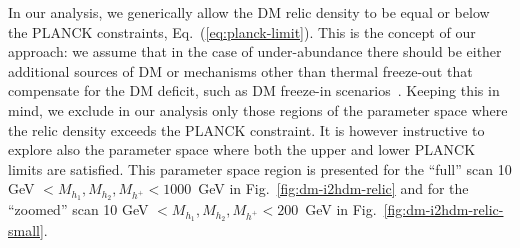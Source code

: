 In our analysis, we generically allow the DM relic density to be equal or
below the PLANCK constraints, Eq.~(\ref{eq:planck-limit}).
This is the concept of our approach: we assume that in the case of under-abundance
there should be either additional sources of DM or mechanisms other than thermal freeze-out that 
compensate for the DM deficit, such as DM freeze-in scenarios~\cite{Hall:2009bx}.
Keeping this in mind, we exclude in our analysis only those regions of the parameter space 
where the relic density exceeds the PLANCK constraint.
It is however instructive to explore also the parameter space where both
the upper and lower PLANCK limits are satisfied.
This parameter space region is presented for the ``full'' scan 10 GeV $< M_{h_1}, M_{h_2}, M_{h^{+}} < 1000$~GeV
in Fig.~\ref{fig:dm-i2hdm-relic} and for the ``zoomed'' scan 10 GeV $< M_{h_1}, M_{h_2}, M_{h^{+}} < 200$~GeV in Fig.~\ref{fig:dm-i2hdm-relic-small}.

